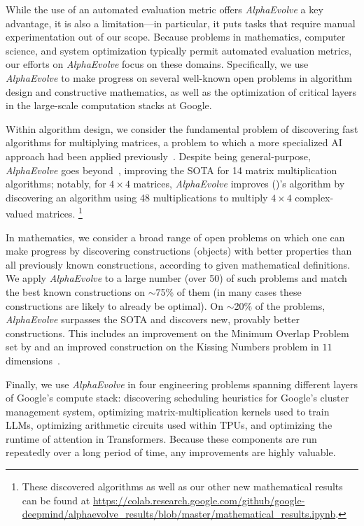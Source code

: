 \documentclass[logo,copyright,12pt]{googledeepmind}
\newcommand\authoryearcitet[1]{
  \citeauthor{#1} (\citeyear{#1})}
\theoremstyle{definition}
\theoremstyle{remark}
\theoremstyle{plain}
\newcommand{\ResultsColabURL}{https://colab.research.google.com/github/google-deepmind/alphaevolve\_results/blob/master/mathematical\_results.ipynb}
\newcommand{\method}{\emph{AlphaEvolve}\xspace}
\begin{document}
While the use of an automated evaluation metric offers \method a key advantage, it is also a limitation---in particular, it puts tasks that require manual experimentation out of our scope. 
Because problems in mathematics, computer science, and system optimization typically permit automated evaluation metrics, our efforts on \method focus on these domains.
Specifically, we use \method to make progress on several well-known open problems in algorithm design and constructive mathematics, as well as the optimization of critical layers in the large-scale computation stacks at Google.

Within algorithm design, we consider the fundamental problem of discovering fast algorithms for multiplying matrices, a problem to which a more specialized AI approach had been applied previously~\citep{fawzi2022discovering}.
Despite being general-purpose, \method goes beyond~\cite{fawzi2022discovering}, improving the SOTA for 14 matrix multiplication algorithms; notably, for $4 \times 4$ matrices, \method improves \authoryearcitet{strassen1969gaussian}'s algorithm by discovering an algorithm using 48 multiplications to multiply $4 \times 4$ complex-valued matrices.
\footnote{These discovered algorithms as well as our other new mathematical results can be found at \url{\ResultsColabURL}.}

In mathematics, we consider a broad range of open problems on which one can make progress by discovering constructions (objects) with better properties than all previously known constructions, according to given mathematical definitions.
We apply \method to a large number (over 50) of such problems and match the best known constructions on $\sim$75\% of them (in many cases these constructions are likely to already be optimal). On $\sim$20\% of the problems, \method surpasses the SOTA and discovers new, provably  better constructions.
This includes an improvement on the Minimum Overlap Problem set by \citet{erdHos1955some} and an improved construction on the Kissing Numbers problem in $11$ dimensions~\citep{kissing_survey,kissing_11}.

Finally, we use \method in four engineering problems spanning different layers of Google's compute stack: discovering scheduling heuristics for Google's cluster management system, optimizing matrix-multiplication kernels used to train LLMs, optimizing arithmetic circuits used within TPUs, and optimizing the runtime of attention in Transformers.
Because these components are run repeatedly over a long period of time, any improvements are highly valuable.
\end{document}

